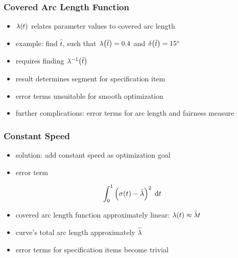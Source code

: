 \documentclass[mathserif]{beamer}
\begin{document}
		\begin{frame}
			\frametitle{Covered Arc Length Function}
			\begin{itemize}
				\item \(\lambda\!\left( t \right)\) relates parameter values to covered arc length
			\end{itemize}
			\begin{itemize}
				\item example: find \(\hat{t}\), such that \(\lambda\!\left( \hat{t} \right) = 0.4\) and \(\delta\!\left( \hat{t} \right) = 15^\circ\)
				\item requires finding \(\lambda^{-1}\!\left( \hat{t} \right)\)
				\item result determines segment for specification item
				\item error terms unsuitable for smooth optimization
				\item further complications: error terms for arc length and fairness measure
			\end{itemize}
		\end{frame}

		\begin{frame}
			\frametitle{Constant Speed}
			\begin{itemize}
				\item solution: add constant speed as optimization goal
				\item error term
			\end{itemize}
			\begin{equation*}
				\int_{0}^{1} \left( \sigma\!\left( t \right) - \hat{\lambda} \right)^2 \; \mathrm{d}t
			\end{equation*}
			\begin{itemize}
				\item covered arc length function approximately linear: \(\lambda\!\left( t \right) \approx \hat{\lambda}t\)
				\item curve's total arc length approximately \(\hat{\lambda}\)
				\item error terms for specification items become trivial
			\end{itemize}
		\end{frame}
\end{document}
